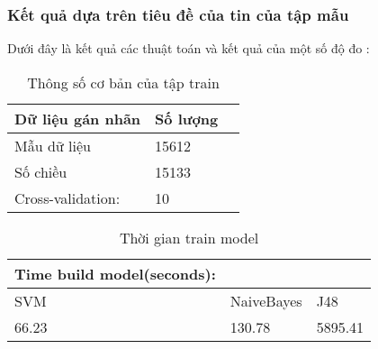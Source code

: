 	\subsubsection{Kết quả dựa trên tiêu đề của tin của tập mẫu}
	Dưới đây là kết quả các thuật toán và kết quả của một số độ đo :
	\begin{table}[H]
		\centering
		\setlength\extrarowheight{3pt}
		\begin{tabular}{|l|l|l|}
			\hline
			Dữ liệu gán nhãn & Số lượng \\
			\hline
			Mẫu dữ liệu   & 15612\\
			\hline
			Số chiều   & 15133\\
			\hline
			Cross-validation:   & 10\\
			\hline
		\end{tabular}%
		\caption{Thông số cơ bản của tập train} \label{tab:table_4_6}%
	\end{table}
	\begin{table}[H]
		\centering
		\begin{tabular}{|l|l|l|}
			\hline
			Time build model(seconds): &            &          \\
			\hline
			SVM                        & NaiveBayes & J48      \\
			\hline
			66.23                     & 130.78     & 5895.41	\\
			\hline
		\end{tabular}
		\caption{Thời gian train model}
		\label{tab:table_4_7}
	\end{table}
	\begin{table}[H]
		\centering
		\caption{Kết quả train model dựa trên một số độ đo}
		\label{tab:table_4_8}
	\end{table}%
